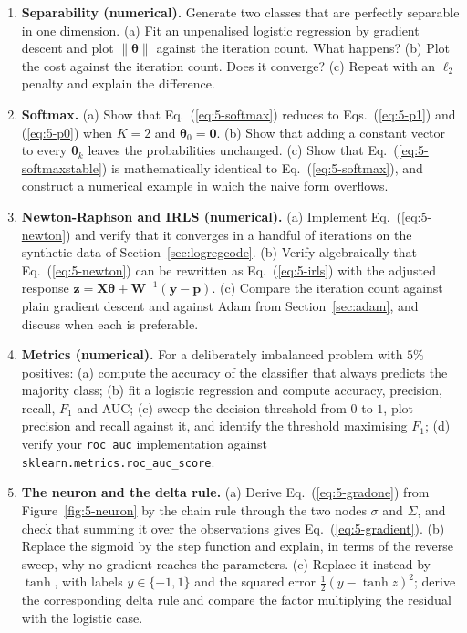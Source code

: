 \begin{enumerate}
\item \textbf{Separability (numerical).}
  Generate two classes that are perfectly separable in one dimension.
  (a) Fit an unpenalised logistic regression by gradient descent and plot
      $\|\bm{\theta}\|$ against the iteration count.  What happens?
  (b) Plot the cost against the iteration count.  Does it converge?
  (c) Repeat with an $\ell_2$ penalty and explain the difference.

\item \textbf{Softmax.}
  (a) Show that Eq.~(\ref{eq:5-softmax}) reduces to
      Eqs.~(\ref{eq:5-p1}) and (\ref{eq:5-p0}) when $K=2$ and
      $\bm{\theta}_0=\bm{0}$.
  (b) Show that adding a constant vector to every $\bm{\theta}_k$ leaves the
      probabilities unchanged.
  (c) Show that Eq.~(\ref{eq:5-softmaxstable}) is mathematically identical to
      Eq.~(\ref{eq:5-softmax}), and construct a numerical example in which the
      naive form overflows.

\item \textbf{Newton-Raphson and IRLS (numerical).}
  (a) Implement Eq.~(\ref{eq:5-newton}) and verify that it converges in a
      handful of iterations on the synthetic data of
      Section~\ref{sec:logregcode}.
  (b) Verify algebraically that Eq.~(\ref{eq:5-newton}) can be rewritten as
      Eq.~(\ref{eq:5-irls}) with the adjusted response
      $\bm{z}=\bm{X}\bm{\theta}+\bm{W}^{-1}(\bm{y}-\bm{p})$.
  (c) Compare the iteration count against plain gradient descent and against
      Adam from Section~\ref{sec:adam}, and discuss when each is preferable.

\item \textbf{Metrics (numerical).}
  For a deliberately imbalanced problem with $5\%$ positives:
  (a) compute the accuracy of the classifier that always predicts the majority
      class;
  (b) fit a logistic regression and compute accuracy, precision, recall,
      $F_1$ and AUC;
  (c) sweep the decision threshold from $0$ to $1$, plot precision and recall
      against it, and identify the threshold maximising $F_1$;
  (d) verify your \texttt{roc\_auc} implementation against
      \texttt{sklearn.metrics.roc\_auc\_score}.

\item \textbf{The neuron and the delta rule.}
  (a) Derive Eq.~(\ref{eq:5-gradone}) from Figure~\ref{fig:5-neuron} by the
      chain rule through the two nodes $\sigma$ and $\Sigma$, and check
      that summing it over the observations gives
      Eq.~(\ref{eq:5-gradient}).
  (b) Replace the sigmoid by the step function and explain, in terms of the
      reverse sweep, why no gradient reaches the parameters.
  (c) Replace it instead by $\tanh$, with labels $y\in\{-1,1\}$ and the
      squared error $\tfrac12(y-\tanh z)^{2}$; derive the corresponding
      delta rule and compare the factor multiplying the residual with the
      logistic case.


\end{enumerate}
